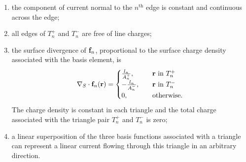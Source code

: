 \begin{enumerate}
\item the component of current normal to the $n^\text{th}$ edge is constant and continuous across the edge;
\item all edges of $T_n^+$ and $T_n^-$ are free of line charges;
\item the surface divergence of $\mathbf{f}_n$, proportional to the surface charge density associated with the basis element, is
\begin{equation} \label{eqn:RWG divergence}
\nabla_S \cdot \mathbf{f}_n \!\left(\mathbf{r}\right) =
\begin{cases}
\frac{l_n}{A_n^+}, & \quad \text{$\mathbf{r}$ in $T_n^+$} \\
-\frac{l_n}{A_n^-}, & \quad \text{$\mathbf{r}$ in $T_n^-$} \\
0, & \quad \text{otherwise}.
\end{cases}
\end{equation}
The charge density is constant in each triangle and the total charge associated with the triangle pair $T_n^+$ and $T_n^-$ is zero;
\item a linear superposition of the three basis functions associated with a triangle can represent a linear current flowing through this triangle in an arbitrary direction.
\end{enumerate}

